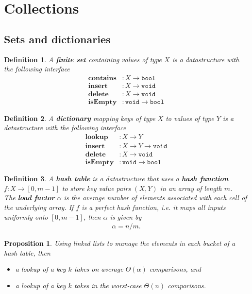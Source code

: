 \documentclass{article}
\theoremstyle{sltheorem}
\newtheorem{definition}{Definition}[section]
\newtheorem{proposition}[theorem]{Proposition}
\newcommand*\B[1]{\textbf{#1}}
\begin{document}
\section{Collections}
\subsection{Sets and dictionaries}
\begin{definition}
	A \B{finite set} containing values of type $X$ is a datastructure with the following interface
	\begin{align*}
		\textbf{contains} &: X\to \texttt{bool}\\
		\textbf{insert} &: X \to \texttt{void}\\
		\textbf{delete} &: X \to \texttt{void}\\
		\textbf{isEmpty} &: \texttt{void} \to \texttt{bool}
	\end{align*}
\end{definition}
\begin{definition}
	A \B{dictionary} mapping keys of type $X$ to values of type $Y$
	is a datastructure with the following interface
	\begin{align*}
		\textbf{lookup} &: X \to Y\\
		\textbf{insert} &: X \to Y \to \texttt{void}\\
		\textbf{delete} &: X \to \texttt{void}\\
		\textbf{isEmpty} &: \texttt{void} \to \texttt{bool}
	\end{align*}
\end{definition}
\begin{definition}
	A \B{hash table} is a datastructure that uses a \B{hash function} $f: X \to [0,m-1]$
	to store key value pairs $(X,Y)$ in an array of length $m$.\\
	The \B{load factor} $\alpha$ is the average number of elements associated with each cell
	of the underlying array. If $f$ is a perfect hash function, i.e. it maps all inputs uniformly
	onto $[0,m-1]$, then $\alpha$ is given by 
	\begin{align*}
		\alpha = n / m.
	\end{align*}
\end{definition}
\begin{proposition}
	Using linked lists to manage the elements in each bucket of a hash table, then
	\begin{itemize}
		\item a lookup of a key $k$  takes on average $\Theta(\alpha)$ comparisons, and
		\item a lookup of a key $k$ takes in the worst-case $\Theta(n)$ comparisons.
	\end{itemize}
\end{proposition}
\end{document}
